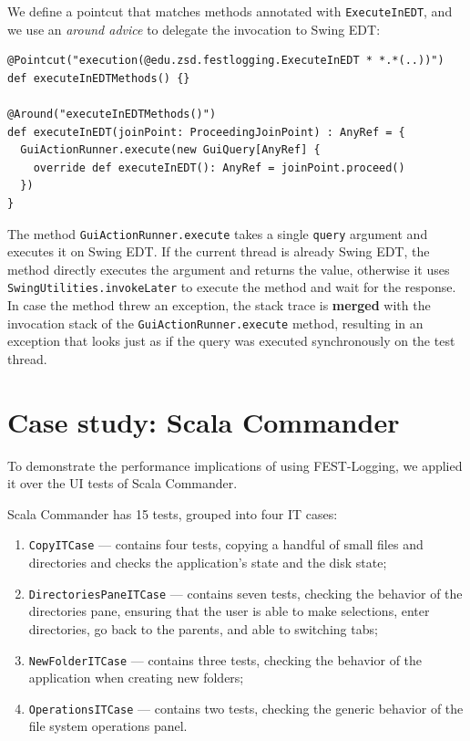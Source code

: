 We define a pointcut that matches methods annotated with \texttt{ExecuteInEDT}, and we use an \emph{around advice} to delegate the invocation to Swing EDT:
\begin{lstlisting}
@Pointcut("execution(@edu.zsd.festlogging.ExecuteInEDT * *.*(..))")
def executeInEDTMethods() {}

@Around("executeInEDTMethods()")
def executeInEDT(joinPoint: ProceedingJoinPoint) : AnyRef = {
  GuiActionRunner.execute(new GuiQuery[AnyRef] {
    override def executeInEDT(): AnyRef = joinPoint.proceed()
  })
}
\end{lstlisting}

The method \texttt{GuiActionRunner.execute} takes a single \texttt{query} argument and executes it on Swing EDT. If the current thread is already Swing EDT, the method directly executes the argument and returns the value, otherwise it uses \texttt{SwingUtilities.invokeLater} to execute the method and wait for the response. In case the method threw an exception, the stack trace is \textbf{merged} with the invocation stack of the \texttt{GuiActionRunner.execute} method, resulting in an exception that looks just as if the query was executed synchronously on the test thread.


\section{Case study: Scala Commander}\label{sec:fest-logging_case-study}

To demonstrate the performance implications of using FEST-Logging, we applied it over the UI tests of Scala Commander. 

Scala Commander has 15 tests, grouped into four IT cases:
\begin{enumerate}
\item \texttt{CopyITCase} --- contains four tests, copying a handful of small files and directories and checks the application's state and the disk state;
\item \texttt{DirectoriesPaneITCase} --- contains seven tests, checking the behavior of the directories pane, ensuring that the user is able to make selections, enter directories, go back to the parents, and able to switching tabs;
\item \texttt{NewFolderITCase} --- contains three tests, checking the behavior of the application when creating new folders;
\item \texttt{OperationsITCase} --- contains two tests, checking the generic behavior of the file system operations panel.
\end{enumerate}

